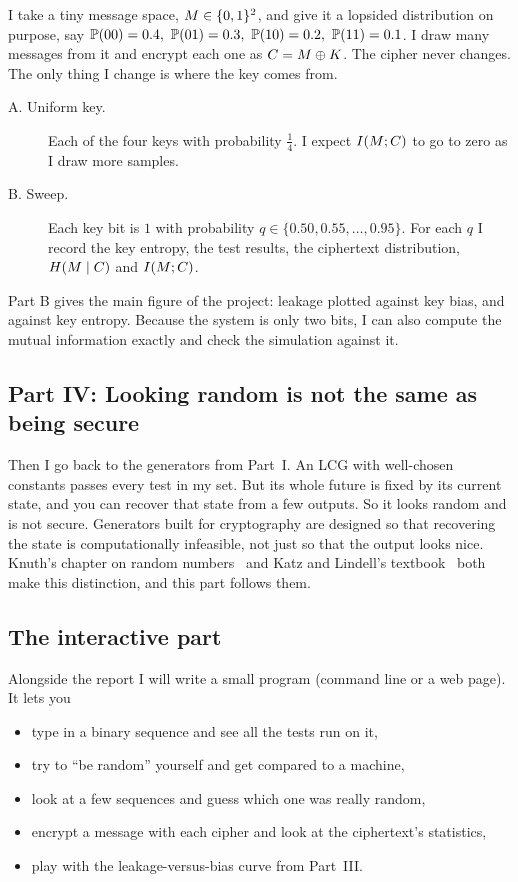 I take a tiny message space, $M \in \{0,1\}^2$, and give it a lopsided
distribution on purpose, say
$\mathbb{P}\!\left(00\right) = 0.4,\ \mathbb{P}\!\left(01\right) = 0.3,\ \mathbb{P}\!\left(10\right) = 0.2,\ \mathbb{P}\!\left(11\right) = 0.1$.
I draw many messages from it and encrypt each one as $C = M \oplus K$.
The cipher never changes. The only thing I change is where the key comes from.
\begin{description}
  \item[A. Uniform key.] Each of the four keys with probability $\tfrac14$.
        I expect $I\!\left(M ; C\right)$ to go to zero as I draw more samples.
  \item[B. Sweep.] Each key bit is $1$ with probability
        $q \in \{0.50, 0.55, \dots, 0.95\}$. For each $q$ I record the key
        entropy, the test results, the ciphertext distribution,
        $H\!\left(M \mid C\right)$ and $I\!\left(M ; C\right)$.
\end{description}
Part B gives the main figure of the project: leakage plotted against key
bias, and against key entropy. Because the system is only two bits, I can
also compute the mutual information exactly and check the simulation against
it.

\subsection{Part IV: Looking random is not the same as being secure}

Then I go back to the generators from Part~I. An LCG with well-chosen
constants passes every test in my set. But its whole future is fixed by its
current state, and you can recover that state from a few outputs. So it looks
random and is not secure. Generators built for cryptography are designed so
that recovering the state is computationally infeasible, not just so that
the output looks nice. Knuth's chapter on random numbers~\cite{knuth1997}
and Katz and Lindell's textbook~\cite{katz2020} both make this distinction,
and this part follows them.

\subsection{The interactive part}

Alongside the report I will write a small program (command line or a web
page). It lets you
\begin{itemize}
  \item type in a binary sequence and see all the tests run on it,
  \item try to ``be random'' yourself and get compared to a machine,
  \item look at a few sequences and guess which one was really random,
  \item encrypt a message with each cipher and look at the ciphertext's
        statistics,
  \item play with the leakage-versus-bias curve from Part~III.
\end{itemize}

